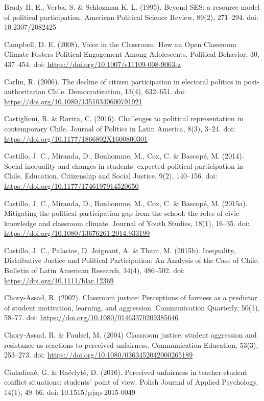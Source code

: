 \documentclass[12pt,twoside]{templates/facsothesis}
\begin{document}
Brady H, E., Verba, S. \& Schlozman K. L. (1995). Beyond SES: a resource model of political participation. American Political Science Review, 89(2), 271--294. doi: 10.2307/2082425

Campbell, D. E. (2008). Voice in the Classroom: How an Open Classroom Climate Fosters Political Engagement Among Adolescents. Political Behavior, 30, 437--454. doi: \url{https://doi.org/10.1007/s11109-008-9063-z}

Carlin, R. (2006). The decline of citizen participation in electoral politics in post-authoritarian Chile. Democratization, 13(4), 632--651. doi: \url{https://doi.org/10.1080/13510340600791921}

Castiglioni, R. \& Rovira, C. (2016). Challenges to political representation in contemporary Chile. Journal of Politics in Latin America, 8(3), 3--24. doi: \url{https://doi.org/10.1177/1866802X1600800301}

Castillo, J. C., Miranda, D., Bonhomme, M., Cox, C. \& Bascopé, M. (2014). Social inequality and changes in students' expected political participation in Chile. Education, Citizenship and Social Justice, 9(2), 140--156. doi: \url{https://doi.org/10.1177/1746197914520650}

Castillo, J. C., Miranda, D., Bonhomme, M., Cox, C. \& Bascopé, M. (2015a). Mitigating the political participation gap from the school: the roles of civic knowledge and classroom climate. Journal of Youth Studies, 18(1), 16--35. doi: \url{https://doi.org/10.1080/13676261.2014.933199}

Castillo, J. C., Palacios, D. Joignant, A. \& Tham, M. (2015b). Inequality, Distributive Justice and Political Participation: An Analysis of the Case of Chile. Bulletin of Latin American Research, 34(4), 486--502. doi: \url{https://doi.org/10.1111/blar.12369}

Chory-Assad, R. (2002). Classroom justice: Perceptions of fairness as a predictor of student motivation, learning, and aggression. Communication Quarterly, 50(1), 58--77. doi: \url{https://doi.org/10.1080/01463370209385646}

Chory‐Assad, R. \& Paulsel, M. (2004) Classroom justice: student aggression and resistance as reactions to perceived unfairness. Communication Education, 53(3), 253--273. doi: \url{https://doi.org/10.1080/0363452042000265189}

Čiuladienė, G. \& Račelytė, D. (2016). Perceived unfairness in teacher-student conflict situations: students' point of view. Polish Journal of Applied Psychology, 14(1), 49--66. doi: 10.1515/pjap-2015-0049
\end{document}
